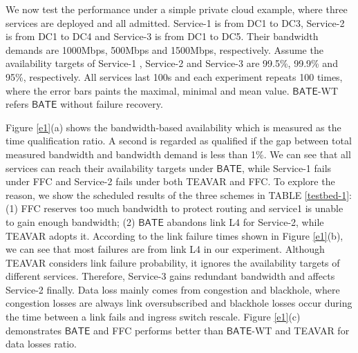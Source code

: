 \documentclass[sigconf]{acmart}
\begin{document}
We now test the performance under a simple private cloud example, where three services are deployed and all admitted.
Service-1 is from DC1 to DC3, Service-2 is from DC1 to DC4 and Service-3 is from DC1 to DC5.
Their bandwidth demands are 1000Mbps, 500Mbps and 1500Mbps, respectively.
Assume the availability targets of Service-1 , Service-2 and Service-3 are  99.5\%, 99.9\% and 95\%, respectively.
All services last 100s and each experiment repeats 100 times,  where the error bars paints the maximal, minimal and mean value.
$\mathsf{BATE}$-WT refers $\mathsf{BATE}$ without failure recovery.

Figure \ref{e1}(a) shows the bandwidth-based availability which is measured as the time qualification ratio. A second is regarded as qualified if the gap between total measured bandwidth and bandwidth demand is less than 1\%.
We can see that all services can reach their availability targets under $\mathsf{BATE}$, while Service-1 fails under FFC and Service-2 fails under both TEAVAR and FFC.
To explore the reason, we show the scheduled results of the three schemes in TABLE \ref{testbed-1}:  
(1) FFC reserves too much bandwidth to protect routing and service1 is unable to gain enough bandwidth;
(2) $\mathsf{BATE}$ abandons link L4 for Service-2, while TEAVAR adopts it.
According to the link failure times shown in Figure \ref{e1}(b), we can see that most failures are from link L4 in our experiment.
Although TEAVAR considers link failure probability, it ignores the availability targets of different services.
Therefore, Service-3 gains redundant bandwidth and affects Service-2 finally.
Data loss mainly comes from congestion and blackhole, where congestion losses are always link oversubscribed and blackhole losses occur during the time between a link fails and ingress switch rescale.
Figure \ref{e1}(c) demonstrates $\mathsf{BATE}$ and FFC performs better than   $\mathsf{BATE}$-WT  and TEAVAR for data losses ratio.
\end{document}
